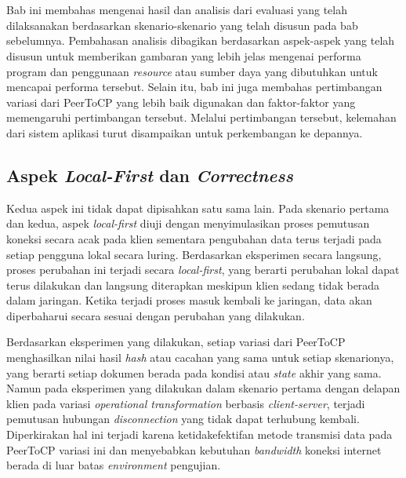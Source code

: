 \chapter{\babLima}
\label{bab:5}

Bab ini membahas mengenai hasil dan analisis dari evaluasi yang telah dilaksanakan berdasarkan skenario-skenario yang telah disusun pada bab sebelumnya. Pembahasan analisis dibagikan berdasarkan aspek-aspek yang telah disusun untuk memberikan gambaran yang lebih jelas mengenai performa program dan penggunaan \textit{resource} atau sumber daya yang dibutuhkan untuk mencapai performa tersebut. Selain itu, bab ini juga membahas pertimbangan variasi dari PeerToCP yang lebih baik digunakan dan faktor-faktor yang memengaruhi pertimbangan tersebut. Melalui pertimbangan tersebut, kelemahan dari sistem aplikasi turut disampaikan untuk perkembangan ke depannya.

\section{Aspek \textit{Local-First} dan \textit{Correctness}}

Kedua aspek ini tidak dapat dipisahkan satu sama lain. Pada skenario pertama dan kedua, aspek \textit{local-first} diuji dengan menyimulasikan proses pemutusan koneksi secara acak pada klien sementara pengubahan data terus terjadi pada setiap pengguna lokal secara luring. Berdasarkan eksperimen secara langsung, proses perubahan ini terjadi secara \textit{local-first}, yang berarti perubahan lokal dapat terus dilakukan dan langsung diterapkan meskipun klien sedang tidak berada dalam jaringan. Ketika terjadi proses masuk kembali ke jaringan, data akan diperbaharui secara sesuai dengan perubahan yang dilakukan.

Berdasarkan eksperimen yang dilakukan, setiap variasi dari PeerToCP menghasilkan nilai hasil \textit{hash} atau cacahan yang sama untuk setiap skenarionya, yang berarti setiap dokumen berada pada kondisi atau \textit{state} akhir yang sama. Namun pada eksperimen yang dilakukan dalam skenario pertama dengan delapan klien pada variasi \textit{operational transformation} berbasis \textit{client-server}, terjadi pemutusan hubungan \textit{disconnection} yang tidak dapat terhubung kembali. Diperkirakan hal ini terjadi karena ketidakefektifan metode transmisi data pada PeerToCP variasi ini dan menyebabkan kebutuhan \textit{bandwidth} koneksi internet berada di luar batas \textit{environment} pengujian.

